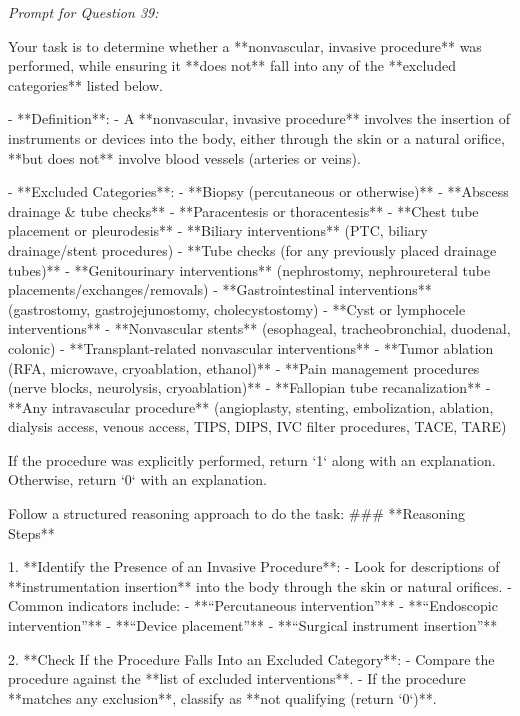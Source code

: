 \textit{\normalsize Prompt for Question  39:}
\begin{mdframed}[]
\normalsize

Your task is to determine whether a **nonvascular, invasive procedure** was performed, while ensuring it **does not** fall into any of the **excluded categories** listed below.

- **Definition**:  
  - A **nonvascular, invasive procedure** involves the insertion of instruments or devices into the body, either through the skin or a natural orifice, **but does not** involve blood vessels (arteries or veins).  

- **Excluded Categories**:  
  - **Biopsy (percutaneous or otherwise)**
  - **Abscess drainage & tube checks**
  - **Paracentesis or thoracentesis**
  - **Chest tube placement or pleurodesis**
  - **Biliary interventions** (PTC, biliary drainage/stent procedures)
  - **Tube checks (for any previously placed drainage tubes)**
  - **Genitourinary interventions** (nephrostomy, nephroureteral tube placements/exchanges/removals)
  - **Gastrointestinal interventions** (gastrostomy, gastrojejunostomy, cholecystostomy)
  - **Cyst or lymphocele interventions**
  - **Nonvascular stents** (esophageal, tracheobronchial, duodenal, colonic)
  - **Transplant-related nonvascular interventions**
  - **Tumor ablation (RFA, microwave, cryoablation, ethanol)**
  - **Pain management procedures (nerve blocks, neurolysis, cryoablation)**
  - **Fallopian tube recanalization**
  - **Any intravascular procedure** (angioplasty, stenting, embolization, ablation, dialysis access, venous access, TIPS, DIPS, IVC filter procedures, TACE, TARE)

If the procedure was explicitly performed, return `1` along with an explanation. Otherwise, return `0` with an explanation.

Follow a structured reasoning approach to do the task:
### **Reasoning Steps**  

1. **Identify the Presence of an Invasive Procedure**:  
   - Look for descriptions of **instrumentation insertion** into the body through the skin or natural orifices.  
   - Common indicators include:  
     - **“Percutaneous intervention”**  
     - **“Endoscopic intervention”**  
     - **“Device placement”**  
     - **“Surgical instrument insertion”**  

2. **Check If the Procedure Falls Into an Excluded Category**:  
   - Compare the procedure against the **list of excluded interventions**.  
   - If the procedure **matches any exclusion**, classify as **not qualifying (return `0`)**.  


\end{mdframed}
